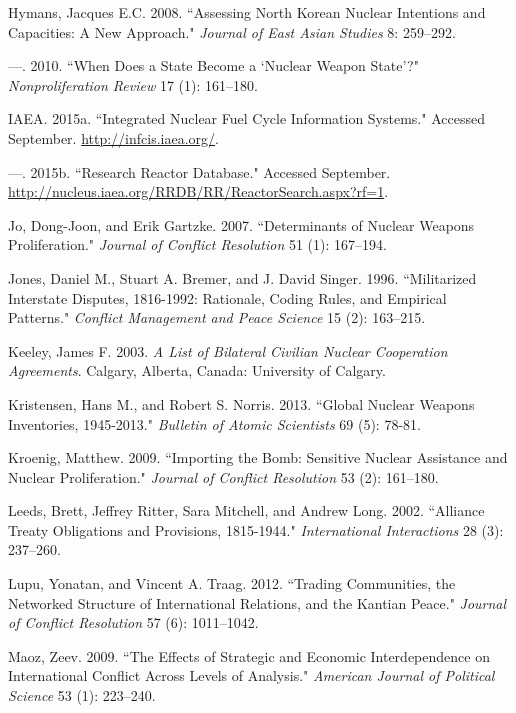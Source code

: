 \begin{thebibliography}{1\kern\bibindent}
 Hymans, Jacques E.C. 2008. ``Assessing North Korean Nuclear Intentions and Capacities: A New Approach." \textit{Journal of East Asian Studies} 8: 259--292.

 ---. 2010. ``When Does a State Become a `Nuclear Weapon State'?" \textit{Nonproliferation Review} 17 (1): 161--180. 

 IAEA. 2015a. ``Integrated Nuclear Fuel Cycle Information Systems." Accessed September. \url{http://infcis.iaea.org/}.

 ---. 2015b. ``Research Reactor Database." Accessed September. \url{http://nucleus.iaea.org/RRDB/RR/ReactorSearch.aspx?rf=1}.

 Jo, Dong-Joon, and Erik Gartzke. 2007. ``Determinants of Nuclear Weapons Proliferation." \textit{Journal of Conflict Resolution} 51 (1): 167--194.

 Jones, Daniel M., Stuart A. Bremer, and J. David Singer. 1996. ``Militarized Interstate Disputes, 1816-1992: Rationale, Coding Rules, and Empirical Patterns." \textit{Conflict Management and Peace Science} 15 (2): 163--215.

 Keeley, James F. 2003. \textit{A List of Bilateral Civilian Nuclear Cooperation Agreements}. Calgary, Alberta, Canada: University of Calgary.

 Kristensen, Hans M., and Robert S. Norris. 2013. ``Global Nuclear Weapons Inventories, 1945-2013." \textit{Bulletin of Atomic Scientists} 69 (5): 78-81.

 Kroenig, Matthew. 2009. ``Importing the Bomb: Sensitive Nuclear Assistance and Nuclear Proliferation." \textit{Journal of Conflict Resolution} 53 (2): 161--180.

 Leeds, Brett, Jeffrey Ritter, Sara Mitchell, and Andrew Long. 2002. ``Alliance Treaty Obligations and Provisions, 1815-1944." \textit{International Interactions} 28 (3): 237--260.

 Lupu, Yonatan, and Vincent A. Traag. 2012. ``Trading Communities, the Networked Structure of International Relations, and the Kantian Peace." \textit{Journal of Conflict Resolution} 57 (6): 1011--1042.

 Maoz, Zeev. 2009. ``The Effects of Strategic and Economic Interdependence on International Conflict Across Levels of Analysis." \textit{American Journal of Political Science} 53 (1): 223--240.


\end{thebibliography}
